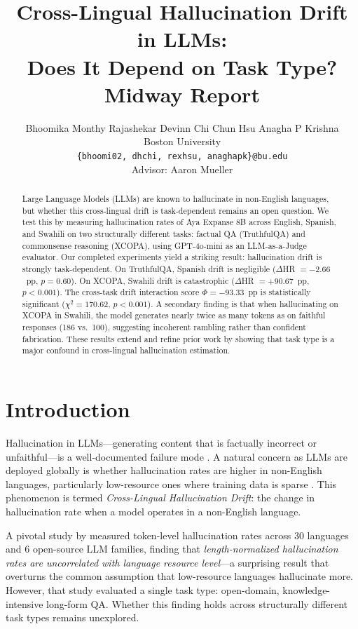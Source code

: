 \documentclass[11pt]{article}
\title{Cross-Lingual Hallucination Drift in LLMs:\\Does It Depend on Task Type?\\
\normalsize Midway Report}
\author{
  Bhoomika Monthy Rajashekar \quad Devinn Chi \quad Chun Hsu \quad Anagha P Krishna \\
  Boston University \\
  \texttt{\{bhoomi02, dhchi, rexhsu, anaghapk\}@bu.edu} \\
  Advisor: Aaron Mueller
}
\begin{document}
\maketitle

\begin{abstract}
Large Language Models (LLMs) are known to hallucinate in non-English languages,
but whether this cross-lingual drift is task-dependent remains an open question.
We test this by measuring hallucination rates of Aya Expanse 8B across English,
Spanish, and Swahili on two structurally different tasks: factual QA (TruthfulQA)
and commonsense reasoning (XCOPA), using GPT-4o-mini as an LLM-as-a-Judge evaluator.
Our completed experiments yield a striking result: hallucination drift is strongly
task-dependent. On TruthfulQA, Spanish drift is negligible ($\Delta$HR $= {-2.66}$~pp,
$p = 0.60$). On XCOPA, Swahili drift is catastrophic ($\Delta$HR $= {+90.67}$~pp,
$p < 0.001$). The cross-task drift interaction score $\Phi = {-93.33}$~pp is
statistically significant ($\chi^2 = 170.62$, $p < 0.001$). A secondary finding
is that when hallucinating on XCOPA in Swahili, the model generates nearly twice
as many tokens as on faithful responses (186 vs.\ 100), suggesting incoherent
rambling rather than confident fabrication. These results extend and refine prior
work by showing that task type is a major confound in cross-lingual hallucination
estimation.
\end{abstract}

\section{Introduction}

Hallucination in LLMs---generating content that is factually incorrect or
unfaithful---is a well-documented failure mode \cite{alansari2025survey}.
A natural concern as LLMs are deployed globally is whether hallucination
rates are higher in non-English languages, particularly low-resource ones
where training data is sparse \cite{blasi-etal-2022-systematic}.
This phenomenon is termed \textit{Cross-Lingual Hallucination Drift}: the
change in hallucination rate when a model operates in a non-English language.

A pivotal study by \citet{ulislam-etal-2025-hallucinate} measured token-level
hallucination rates across 30 languages and 6 open-source LLM families, finding
that \textit{length-normalized hallucination rates are uncorrelated with language
resource level}---a surprising result that overturns the common assumption that
low-resource languages hallucinate more. However, that study evaluated a single
task type: open-domain, knowledge-intensive long-form QA. Whether this finding
holds across structurally different task types remains unexplored.
\end{document}
